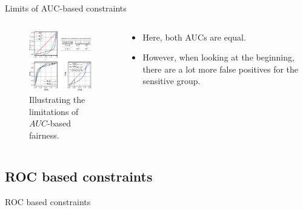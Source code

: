 \begin{frame}{Limits of AUC-based constraints}
    \begin{columns}
        \begin{column}{0.5\textwidth}
            \begin{figure}[t]
                \centering
                \includegraphics[width=1\columnwidth, trim = 0cm 0cm 2.35cm 2.4cm, clip]{images/original_paper/example_simple_dists_explained_with_table2.pdf}
                \caption{Illustrating the limitations of $AUC$-based fairness.}
                \label{fig:example-1}
            \end{figure}
        \end{column}

        \begin{column}{0.5\textwidth}
            \begin{itemize}
                \item Here, both AUCs are equal.
                \item However, when looking at the beginning, there are a lot more false positives for the sensitive group.
            \end{itemize}
        \end{column}
    \end{columns}
    
\end{frame}

\subsection{ROC based constraints}
\begin{frame}{ROC based constraints}
    
\end{frame}
